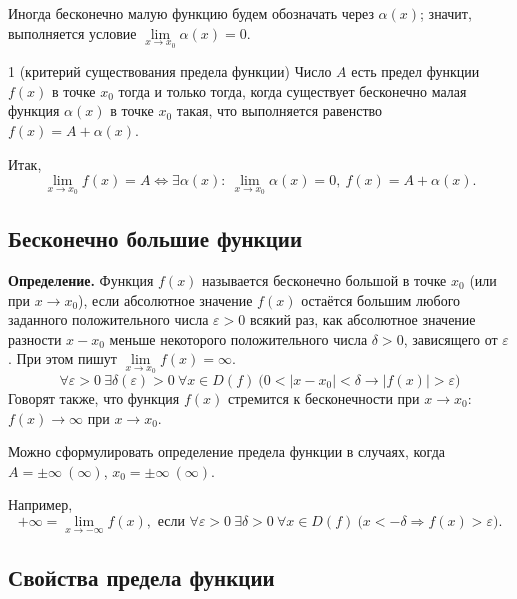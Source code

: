 \documentclass[a4paper,11pt]{article}
\begin{document}
Иногда бесконечно малую функцию будем обозначать через $\alpha(x)$; значит, выполняется
условие $\lim\limits_{x \to x_0} \alpha(x) = 0$.

\begin{teor}{1 (критерий существования предела функции)}
  Число $A$ есть предел функции $f(x)$ в точке $x_0$ тогда и только тогда, когда существует
  бесконечно малая функция $\alpha(x)$ в точке $x_0$ такая, что выполняется равенство
  $f(x) = A + \alpha(x)$.

  Итак,
  \[
    \lim_{x \to x_0} f(x) = A \Leftrightarrow \exists \alpha(x):\ \lim_{x \to x_0} \alpha(x) = 0,\
    f(x) = A + \alpha(x).
  \]
\end{teor}

\subsection{Бесконечно большие функции}

\begin{opr}
\textbf{Определение.}
  Функция $f(x)$ называется бесконечно большой в точке $x_0$ (или при $x \to x_0$), если
  абсолютное значение $f(x)$ остаётся большим любого заданного положительного числа
  $\varepsilon > 0$ всякий раз, как абсолютное значение разности $x - x_0$ меньше некоторого
  положительного числа $\delta > 0$, зависящего от $\varepsilon$. При этом пишут
  $\lim\limits_{x \to x_0} f(x) = \infty$.
  \[
    \forall \varepsilon > 0\ \exists \delta(\varepsilon) > 0\ \forall x \in D(f)\
    \bigl( 0 < |x - x_0| < \delta \rightarrow |f(x)| > \varepsilon \bigr)
  \]
  Говорят также, что функция $f(x)$ стремится к бесконечности при $x \to x_0$:
  $f(x) \to \infty$ при $x \to x_0$.
\end{opr}

Можно сформулировать определение предела функции в случаях, когда
$A = \pm\infty\ (\infty)$, $x_0 = \pm\infty\ (\infty)$.

Например,
\[
  +\infty = \lim_{x \to -\infty} f(x), \text{ если } \forall \varepsilon > 0\ \exists \delta > 0\
  \forall x \in D(f)\ \bigl( x < -\delta \Rightarrow f(x) > \varepsilon \bigr).
\]

\subsection{Свойства предела функции}
\end{document}
